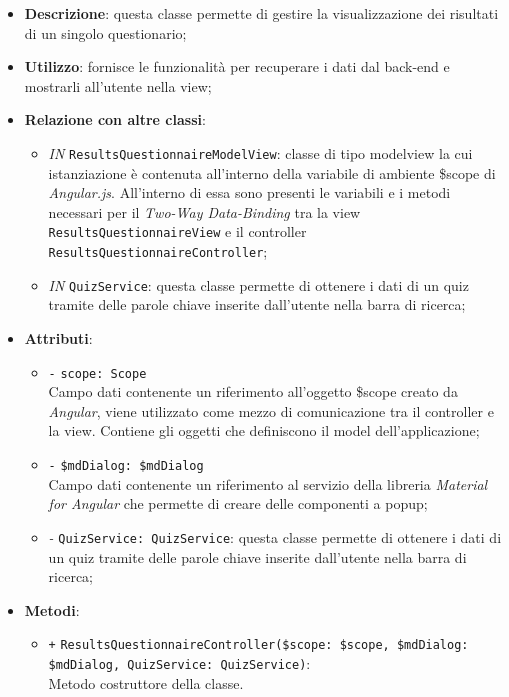 \begin{itemize}
	\item \textbf{Descrizione}: questa classe permette di gestire la visualizzazione dei risultati di un singolo questionario;
	\item \textbf{Utilizzo}: fornisce le funzionalità per recuperare i dati dal back-end e mostrarli all'utente nella view;
	\item \textbf{Relazione con altre classi}:
	\begin{itemize}
		\item \textit{IN} \texttt{ResultsQuestionnaireModelView}: classe di tipo modelview la cui istanziazione è contenuta all'interno della variabile di ambiente \$scope di \textit{Angular.js}. All'interno di essa sono presenti le variabili e i metodi necessari per il \textit{Two-Way Data-Binding} tra la view \texttt{ResultsQuestionnaireView} e il controller \texttt{ResultsQuestionnaireController}; 
		\item \textit{IN} \texttt{QuizService}: questa classe permette di ottenere i dati di un quiz tramite delle parole chiave inserite dall'utente nella barra di ricerca;
	\end{itemize}
	\item \textbf{Attributi}:
	\begin{itemize}
		\item \texttt{-} \texttt{scope: Scope} \\
		Campo dati contenente un riferimento all’oggetto \$scope creato da \textit{Angular}, viene utilizzato come mezzo di comunicazione tra il controller e la view. Contiene gli oggetti che definiscono il model dell’applicazione;
		\item \texttt{-} \texttt{\$mdDialog: \$mdDialog} \\
		Campo dati contenente un riferimento al servizio della libreria \textit{Material for Angular} che permette di creare delle componenti a popup;
		\item \textit{-} \texttt{QuizService: QuizService}: questa classe permette di ottenere i dati di un quiz tramite delle parole chiave inserite dall'utente nella barra di ricerca;
	\end{itemize}
	\item \textbf{Metodi}:
	\begin{itemize}
		\item \texttt{+} \texttt{ResultsQuestionnaireController(\$scope: \$scope, \$mdDialog: \$mdDialog, QuizService: QuizService)}: \\Metodo costruttore della classe. \\

\end{itemize}
\end{itemize}
